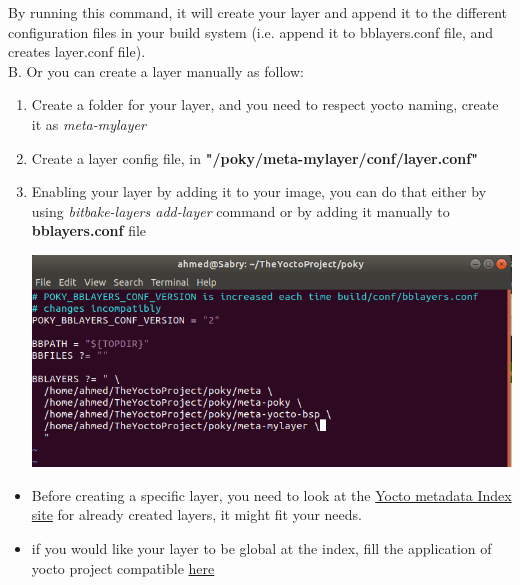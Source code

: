 \documentclass{article}
\begin{document}
By running this command, it will create your layer and append it to the different configuration files in your build system (i.e. append it to bblayers.conf file, and creates layer.conf file).\\

B. Or you can create a layer manually as follow:
\begin{enumerate}
    \item Create a folder for your layer, and you need to respect yocto naming, create it as \textit{meta-mylayer}
    
    
    \item Create a layer config file, in \textbf{"/poky/meta-mylayer/conf/layer.conf"}
    
    
    \item Enabling your layer by adding it to your image, you can do that either by using \textit{bitbake-layers add-layer} command or by adding it manually to \textbf{bblayers.conf} file 
    
    
    
    \begin{center}
  \includegraphics[scale=0.60]{./resources/img/append-to-bblayer.confFile.png}
\end{center}
\end{enumerate}

\begin{mybox}[title={Note: Yocto meta-layer index site ?}]
\begin{itemize}
    \item Before creating a specific layer, you need to look at the \href{https://layers.openembedded.org/layerindex/branch/master/layers/}{Yocto metadata Index site} for already created layers, it might fit your needs.
    \item if you would like your layer to be global at the index, fill the application of yocto project compatible \href{https://www.yoctoproject.org/ecosystem/branding/compatible-registration/}{here}
\end{itemize}  
\end{mybox}
\end{document}
